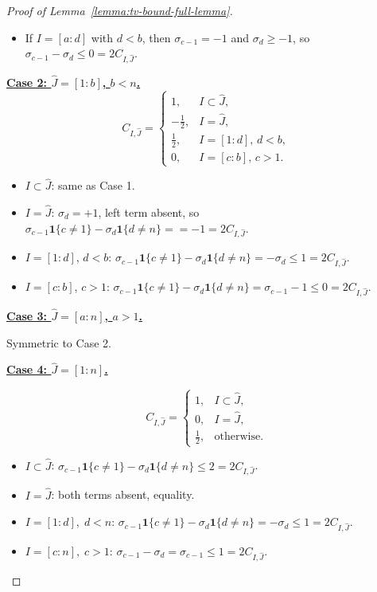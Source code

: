 \documentclass[11pt]{article}
\newcommand{\one}{\mathbf 1}
\theoremstyle{plain}
\theoremstyle{definition}
\theoremstyle{remark}
\begin{document}
\begin{appendix}
\begin{proof}[Proof of Lemma~\ref{lemma:tv-bound-full-lemma}]
\begin{itemize}
\item If $I=[a:d]$ with $d<b$, then $\sigma_{c-1}=-1$ and $\sigma_d\ge -1$,
so $\sigma_{c-1}-\sigma_d\le 0=2C_{I,\hat J}$.
\end{itemize}

\medskip
\noindent\underline{\textbf{Case 2: $\hat J=[1:b]$, $b<n$.}}
\[
C_{I,\hat J}=
\begin{cases}
1,& I\subset \hat J,\\
-\tfrac12,& I=\hat J,\\
\tfrac12,& I=[1:d],\,d<b,\\
0,& I=[c:b],\,c>1.
\end{cases}
\]

\begin{itemize}
\item $I\subset \hat J$: same as Case 1.

\item $I=\hat J$: $\sigma_d=+1$, left term absent,
so $\sigma_{c-1}\one\{c\neq 1\}-\sigma_d\one\{d\neq n\}==-1=2C_{I,\hat J}$.

\item $I=[1:d]$, $d<b$:
$\sigma_{c-1}\one\{c\neq 1\}-\sigma_d\one\{d\neq n\}=-\sigma_d\le 1=2C_{I,\hat J}$.

\item $I=[c:b]$, $c>1$:
$\sigma_{c-1}\one\{c\neq 1\}-\sigma_d\one\{d\neq n\}=\sigma_{c-1}-1\le 0=2C_{I,\hat J}$.
\end{itemize}

\medskip
\noindent\underline{\textbf{Case 3: $\hat J=[a:n]$, $a>1$.}}

Symmetric to Case 2.

\medskip
\noindent\underline{\textbf{Case 4: $\hat J=[1:n]$.}}

\[
C_{I,\hat J}=
\begin{cases}
1,& I\subset \hat J,\\
0,& I=\hat J,\\
\tfrac12,& \text{otherwise}.
\end{cases}
\]

\begin{itemize}
\item $I\subset \hat J$: $\sigma_{c-1}\one\{c\neq 1\}-\sigma_d\one\{d\neq n\}\leq 2=2C_{I,\hat J}$.
\item $I=\hat J$: both terms absent, equality.
\item $I=[1:d],\;d<n$: $\sigma_{c-1}\one\{c\neq 1\}-\sigma_d\one\{d\neq n\}=-\sigma_d\le 1=2C_{I,\hat J}$.
\item $I=[c:n],\;c>1$: $\sigma_{c-1}-\sigma_d=\sigma_{c-1}\le 1=2C_{I,\hat J}$.
\end{itemize}


\end{proof}
\end{appendix}
\end{document}
